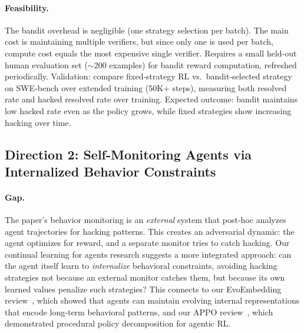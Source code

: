 \documentclass[11pt,a4paper]{article}
\begin{document}
\paragraph{Feasibility.} The bandit overhead is negligible (one strategy selection per batch). The main cost is maintaining multiple verifiers, but since only one is used per batch, compute cost equals the most expensive single verifier. Requires a small held-out human evaluation set ($\sim$200 examples) for bandit reward computation, refreshed periodically. Validation: compare fixed-strategy RL vs.\ bandit-selected strategy on SWE-bench over extended training (50K+ steps), measuring both resolved rate and hacked resolved rate over training. Expected outcome: bandit maintains low hacked rate even as the policy grows, while fixed strategies show increasing hacking over time.

\subsection{Direction 2: Self-Monitoring Agents via Internalized Behavior Constraints}

\paragraph{Gap.} The paper's behavior monitoring is an \emph{external} system that post-hoc analyzes agent trajectories for hacking patterns. This creates an adversarial dynamic: the agent optimizes for reward, and a separate monitor tries to catch hacking. Our continual learning for agents research suggests a more integrated approach: can the agent itself learn to \emph{internalize} behavioral constraints, avoiding hacking strategies not because an external monitor catches them, but because its own learned values penalize such strategies? This connects to our EvoEmbedding review~\cite{li2026evoembedding}, which showed that agents can maintain evolving internal representations that encode long-term behavioral patterns, and our APPO review~\cite{chen2026appo}, which demonstrated procedural policy decomposition for agentic RL.
\end{document}
